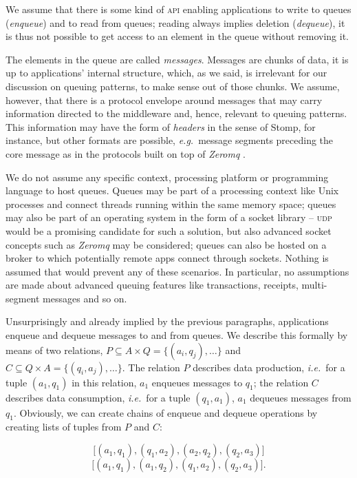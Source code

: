 \documentclass[a4paper]{scrartcl}
\newcommand\eg{\textit{e.g.}}
\newcommand\ie{\textit{i.e.}}
\newcommand{\acronym}[1]{\textsc{#1}}
\newcommand{\term}[1]{\emph{#1}}
\begin{document}
We assume that there is some kind of \acronym{api} enabling applications
to write to queues (\term{enqueue}) and to read from queues;
reading always implies deletion (\term{dequeue}),
it is thus not possible to get access to an element in the queue
without removing it.

The elements in the queue are called \term{messages}.
Messages are chunks of data,
it is up to applications' internal structure,
which, as we said, is irrelevant for our discussion on queuing patterns,
to make sense out of those chunks.
We assume, however, that there is a protocol envelope around messages
that may carry information directed to the middleware
and, hence, relevant to queuing patterns.
This information may have the form of \term{headers}
in the sense of Stomp, for instance,
but other formats are possible,
\eg\ message segments preceding the core message
as in the protocols built on top of 
\term{Zeromq} \cite{cc13}.

We do not assume any specific context, processing platform
or programming language to host queues.
Queues may be part of a processing context
like Unix processes and connect threads 
running within the same memory space;
queues may also be part of an operating system
in the form of a socket library -- 
\acronym{udp} would be a promising candidate
for such a solution,
but also advanced socket concepts such as \term{Zeromq}
may be considered;
queues can also be hosted on a broker
to which potentially remote apps connect
through sockets.
Nothing is assumed that would prevent 
any of these scenarios.
In particular, no assumptions are made
about advanced queuing features like
transactions, receipts, multi-segment messages
and so on.

Unsurprisingly and already implied 
by the previous paragraphs,
applications enqueue and dequeue messages
to and from queues.
We describe this formally by means of two relations,
$P \subseteq A \times Q = \{(a_i,q_j),\dots\}$ and 
$C \subseteq Q \times A = \{(q_i,a_j),\dots\}$. 
The relation $P$ describes data production,
\ie\ for a tuple $(a_1,q_1)$ in this relation,
$a_1$ enqueues messages to $q_1$;
the relation $C$ describes data consumption,
\ie\ for a tuple $(q_1,a_1)$,
$a_1$ dequeues messages from $q_1$.
Obviously, we can create chains of enqueue and dequeue operations
by creating lists of tuples from $P$ and $C$:

\begin{equation}
\lbrack(a_1,q_1), (q_1,a_2), (a_2, q_2), (q_2, a_3)\rbrack 
\end{equation}
\begin{equation}
\lbrack(a_1,q_1),(a_1,q_2),(q_1,a_2),(q_2,a_3)\rbrack.
\end{equation}
\end{document}
